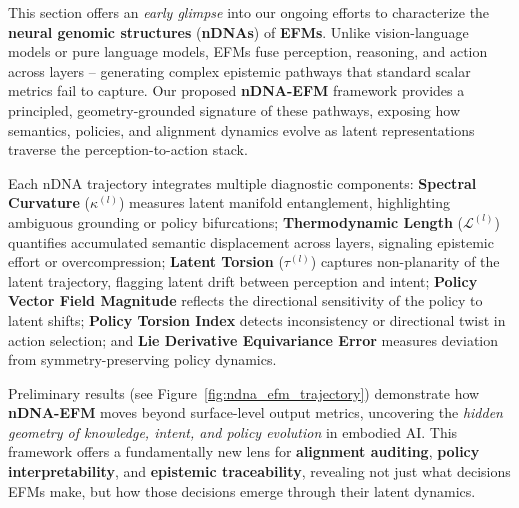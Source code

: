 \vspace{-2mm}
\noindent
This section offers an \emph{early glimpse} into our ongoing efforts to characterize the \textbf{neural genomic structures} (\textbf{nDNAs}) of \textbf{EFMs}. Unlike vision-language models or pure language models, EFMs fuse perception, reasoning, and action across layers -- generating complex epistemic pathways that standard scalar metrics fail to capture. Our proposed \textbf{nDNA-EFM} framework provides a principled, geometry-grounded signature of these pathways, exposing how semantics, policies, and alignment dynamics evolve as latent representations traverse the perception-to-action stack.  

Each nDNA trajectory integrates multiple diagnostic components: \textbf{Spectral Curvature} ($\kappa^{(l)}$) measures latent manifold entanglement, highlighting ambiguous grounding or policy bifurcations; \textbf{Thermodynamic Length} ($\mathcal{L}^{(l)}$) quantifies accumulated semantic displacement across layers, signaling epistemic effort or overcompression; \textbf{Latent Torsion} ($\tau^{(l)}$) captures non-planarity of the latent trajectory, flagging latent drift between perception and intent; \textbf{Policy Vector Field Magnitude} reflects the directional sensitivity of the policy to latent shifts; \textbf{Policy Torsion Index} detects inconsistency or directional twist in action selection; and \textbf{Lie Derivative Equivariance Error} measures deviation from symmetry-preserving policy dynamics.  

Preliminary results (see Figure~\ref{fig:ndna_efm_trajectory}) demonstrate how \textbf{nDNA-EFM} moves beyond surface-level output metrics, uncovering the \emph{hidden geometry of knowledge, intent, and policy evolution} in embodied AI. This framework offers a fundamentally new lens for \textbf{alignment auditing}, \textbf{policy interpretability}, and \textbf{epistemic traceability}, revealing not just what decisions EFMs make, but how those decisions emerge through their latent dynamics.



